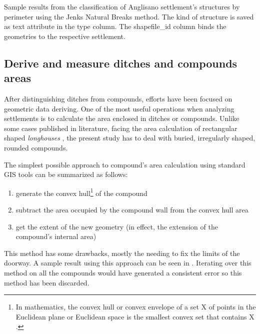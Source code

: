             \begin{table}
                \centering
                
                \caption[Sample geometry classification results from Anglisano settlements using Jenk Natural Breaks method]{Sample results from the classification of Anglisano settlement's structures by perimeter using the Jenks Natural Breaks method. The kind of structure is saved as text attribute in the \textsf{type} column. The \textsf{shapefile\_id} column binds the geometries to the respective settlement.}
                \label{tab:jnb-results}
            \end{table}

        \subsection{Derive and measure ditches and compounds areas}
            After distinguishing ditches from compounds, efforts have been focused on geometric data deriving. One of the most useful operations when analyzing settlements is to calculate the area enclosed in ditches or compounds. Unlike some cases published in literature, facing the area calculation of rectangular shaped \emph{longhouses} \cite{spatial-south-europe}, the present study has to deal with buried, irregularly shaped, rounded compounds.

            The simplest possible approach to compound's area calculation using standard GIS tools can be summarized as follows:
            
            \begin{enumerate}
                \item generate the convex hull\footnote{In mathematics, the convex hull or convex envelope of a set X of points in the Euclidean plane or Euclidean space is the smallest convex set that contains X \cite{wiki:hull}.} of the compound
                \item subtract the area occupied by the compound wall from the convex hull area
                \item get the extent of the new geometry (in effect, the extension of the compound's internal area)
            \end{enumerate}

            This method has some drawbacks, mostly the needing to fix the limits of the doorway. A sample result using this approach can be seen in . Iterating over this method on all the compounds would have generated a consistent error so this method has been discarded.

